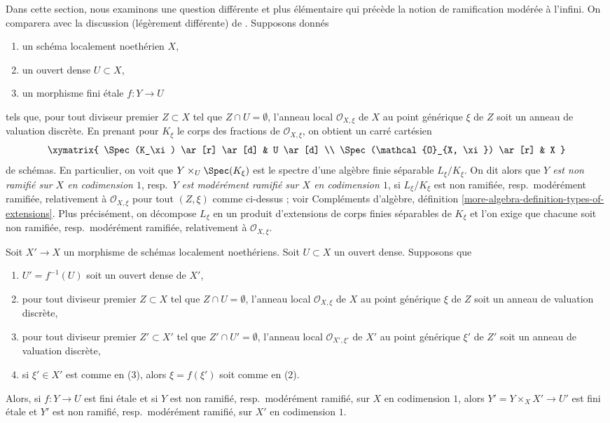 \medskip\noindent
Dans cette section, nous examinons une question différente et plus élémentaire qui
précède la notion de ramification modérée à l'infini.
On comparera avec la discussion (légèrement différente)
de \cite{Grothendieck-Murre}.
Supposons donnés
\begin{enumerate}
\item un schéma localement noethérien $X$,
\item un ouvert dense $U \subset X$,
\item un morphisme fini \'etale $f : Y \to U$
\end{enumerate}
tels que, pour tout diviseur premier $Z \subset X$
tel que $Z \cap U = \emptyset$, l'anneau local $\mathcal{O}_{X, \xi}$
de $X$ au point générique $\xi$ de $Z$ soit un anneau de valuation discrète.
En prenant pour $K_\xi$ le corps des fractions de $\mathcal{O}_{X, \xi}$,
on obtient un carré cartésien
$$
\xymatrix{
\Spec(K_\xi) \ar[r] \ar[d] & U \ar[d] \\
\Spec(\mathcal{O}_{X, \xi}) \ar[r] & X
}
$$
de schémas. En particulier, on voit que $Y \times_U \Spec(K_\xi)$
est le spectre d'une algèbre finie séparable $L_\xi/K_\xi$.
On dit alors que
{\it $Y$ est non ramifié sur $X$ en codimension $1$},
resp.\ {\it $Y$ est modérément ramifié sur $X$ en codimension $1$},
si $L_\xi/K_\xi$ est non ramifiée, resp.\ modérément ramifiée,
relativement à $\mathcal{O}_{X, \xi}$ pour tout $(Z, \xi)$
comme ci-dessus ; voir Compléments d'algèbre, définition
\ref{more-algebra-definition-types-of-extensions}.
Plus précisément, on décompose $L_\xi$ en un produit d'extensions
de corps finies séparables de $K_\xi$ et l'on exige que chacune soit
non ramifiée, resp.\ modérément ramifiée, relativement à
$\mathcal{O}_{X, \xi}$.

\begin{lemma}
\label{lemma-pullback-tame-codim1}
Soit $X' \to X$ un morphisme de schémas localement noethériens.
Soit $U \subset X$ un ouvert dense. Supposons que
\begin{enumerate}
\item $U' = f^{-1}(U)$ soit un ouvert dense de $X'$,
\item pour tout diviseur premier $Z \subset X$ tel que $Z \cap U = \emptyset$,
l'anneau local $\mathcal{O}_{X, \xi}$ de $X$ au point générique $\xi$
de $Z$ soit un anneau de valuation discrète,
\item pour tout diviseur premier $Z' \subset X'$
tel que $Z' \cap U' = \emptyset$, l'anneau local $\mathcal{O}_{X', \xi'}$
de $X'$ au point générique $\xi'$ de $Z'$ soit un anneau de valuation discrète,
\item si $\xi' \in X'$ est comme en (3), alors $\xi = f(\xi')$ soit comme en (2).
\end{enumerate}
Alors, si $f : Y \to U$ est fini \'etale et si
$Y$ est non ramifié, resp.\ modérément ramifié, sur $X$
en codimension $1$, alors $Y' = Y \times_X X' \to U'$ est fini \'etale
et $Y'$ est non ramifié, resp.\ modérément ramifié, sur $X'$ en codimension $1$.
\end{lemma}

